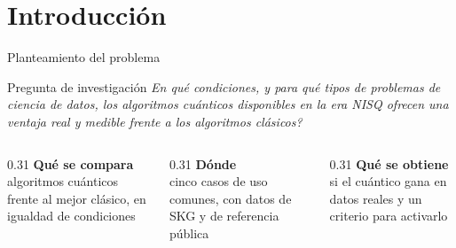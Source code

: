 \documentclass[aspectratio=169,10pt,professionalfonts]{beamer}
\begin{document}
\section{Introducción}
\begin{frame}{Planteamiento del problema}
\vspace{0.4em}
\begin{block}{Pregunta de investigación}
\itshape
\textquestiondown{}En qué condiciones, y para qué tipos de problemas de ciencia de datos,
los algoritmos cuánticos disponibles en la era NISQ ofrecen una
ventaja real y medible frente a los algoritmos clásicos?
\end{block}

\vspace{0.8em}
\begin{columns}[T]
\begin{column}{0.31\textwidth}
\centering\textbf{\textcolor{unirnavy}{Qué se compara}}\\[0.2em]
{\small algoritmos cuánticos frente al mejor clásico, en igualdad de condiciones}
\end{column}
\begin{column}{0.31\textwidth}
\centering\textbf{\textcolor{unirnavy}{Dónde}}\\[0.2em]
{\small cinco casos de uso comunes, con datos de SKG y de referencia pública}
\end{column}
\begin{column}{0.31\textwidth}
\centering\textbf{\textcolor{unirnavy}{Qué se obtiene}}\\[0.2em]
{\small si el cuántico gana en datos reales y un criterio para activarlo}
\end{column}
\end{columns}
\end{frame}
\end{document}
